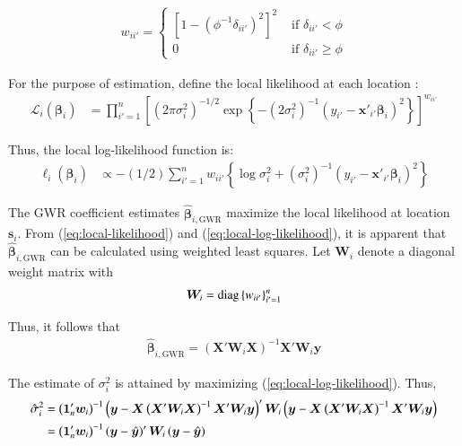 \documentclass[authoryear, review, 11pt]{elsarticle}
\begin{document}
	\begin{align}\label{eq:bisquare}
		w_{ii'} = \begin{cases} \left[1-\left(\phi^{-1}\delta_{ii'}\right)^2\right]^2 &\mbox{ if } \delta_{ii'} < \phi \\ 0 &\mbox{ if } \delta_{ii'} \geq \phi \end{cases}
	\end{align}
	
	For the purpose of estimation, define the local likelihood at each location \citep{Fotheringham:2002}:
	\begin{align}\label{eq:local-likelihood}
		\mathcal{L}_i \left(\bm{\beta}_i \right) &= \prod_{i'=1}^n \left[ \left(2 \pi \sigma^2_i  \right)^{-1/2}  \exp\left\{-\left(2 \sigma^2_i\right)^{-1}  \left(y_{i'} - \bm{x}'_{i'} \bm{\beta}_i \right)^2 \right\} \right] ^ {w_{ii'}}
	\end{align}
			
	Thus, the local log-likelihood function is:
	\begin{align}\label{eq:local-log-likelihood}
		\ell_i\left(\bm{\beta}_i\right) &\propto -(1/2) \sum_{i'=1}^n w_{ii'} \left\{ \log{\sigma^2_i}  + \left(\sigma^2_i\right)^{-1}  \left(y_{i'} - \bm{x}'_{i'} \bm{\beta}_i \right)^2 \right\}
	\end{align}
	
	The GWR coefficient estimates $\hat{\bm{\beta}}_{i,\text{GWR}}$ maximize the local likelihood at location $\bm{s}_i$. From (\ref{eq:local-likelihood}) and (\ref{eq:local-log-likelihood}), it is apparent that $\hat{\bm{\beta}}_{i,\text{GWR}}$ can be calculated using weighted least squares. Let $\bm{W}_i$ denote a diagonal weight matrix with
	\begin{align}
		\bm{W}_i =  {\rm diag}\left\{w_{ii'}\right\}_{i' = 1}^n
	\end{align}
	
	Thus, it follows that
	\begin{align}
		\hat{\bm{\beta}}_{i, \text{GWR}} = \left( \bm{X}'\bm{W}_i\bm{X} \right)^{-1} \bm{X}'\bm{W}_i\bm{y}
	\end{align}
	
	The estimate of $\sigma_i^2$ is attained by maximizing (\ref{eq:local-log-likelihood}). Thus,
	\begin{align}
		\hat{\sigma}^2_i &= \left(\bm{1}_n'\bm{w}_i \right)^{-1} \left(\bm{y}-\bm{X}\left(\bm{X}'\bm{W}_i\bm{X}\right)^{-1}\bm{X}'\bm{W}_i\bm{y}\right)' \bm{W}_i \left(\bm{y}-\bm{X}\left(\bm{X}'\bm{W}_i\bm{X}\right)^{-1}\bm{X}'\bm{W}_i\bm{y}\right) \notag \\
		&= \left(\bm{1}_n'\bm{w}_i \right)^{-1}  \left(\bm{y}-\hat{\bm{y}}\right)' \bm{W}_i \left(\bm{y}-\hat{\bm{y}}\right)
	\end{align}
	
\end{document}

